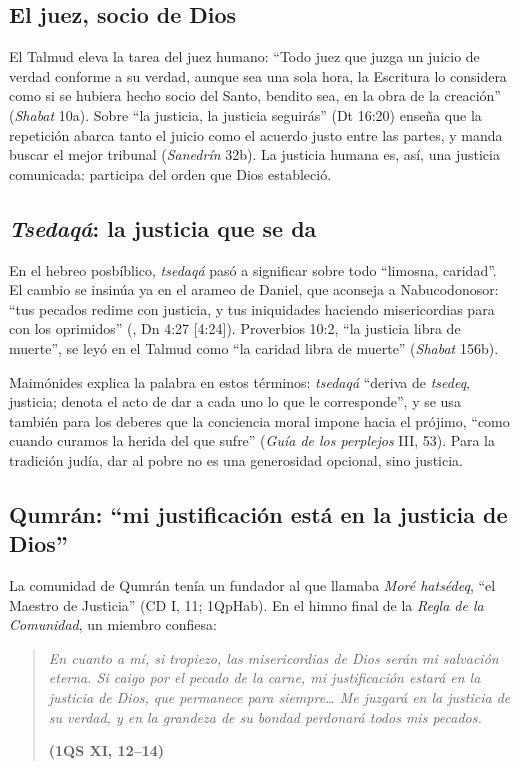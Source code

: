 \subsection{El juez, socio de Dios}
El Talmud eleva la tarea del juez humano: ``Todo juez que juzga un juicio de verdad conforme a su verdad, aunque sea una sola hora, la Escritura lo considera como si se hubiera hecho socio del Santo, bendito sea, en la obra de la creación'' (\emph{Shabat} 10a). Sobre ``la justicia, la justicia seguirás'' (Dt 16:20) enseña que la repetición abarca tanto el juicio como el acuerdo justo entre las partes, y manda buscar el mejor tribunal (\emph{Sanedrín} 32b). La justicia humana es, así, una justicia comunicada: participa del orden que Dios estableció.

\subsection{\emph{Tsedaqá}: la justicia que se da}
En el hebreo posbíblico, \emph{tsedaqá} pasó a significar sobre todo ``limosna, caridad''. El cambio se insinúa ya en el arameo de Daniel, que aconseja a Nabucodonosor: ``tus pecados redime con justicia, y tus iniquidades haciendo misericordias para con los oprimidos'' (, Dn 4:27 [4:24]). Proverbios 10:2, ``la justicia libra de muerte'', se leyó en el Talmud como ``la caridad libra de muerte'' (\emph{Shabat} 156b).

Maimónides explica la palabra en estos términos: \emph{tsedaqá} ``deriva de \emph{tsedeq}, justicia; denota el acto de dar a cada uno lo que le corresponde'', y se usa también para los deberes que la conciencia moral impone hacia el prójimo, ``como cuando curamos la herida del que sufre'' (\emph{Guía de los perplejos} III, 53). Para la tradición judía, dar al pobre no es una generosidad opcional, sino justicia.

\subsection{Qumrán: “mi justificación está en la justicia de Dios”}
La comunidad de Qumrán tenía un fundador al que llamaba  \emph{Moré hatsédeq}, ``el Maestro de Justicia'' (CD I, 11; 1QpHab). En el himno final de la \emph{Regla de la Comunidad}, un miembro confiesa:

\begin{quote}\itshape
En cuanto a mí, si tropiezo, las misericordias de Dios serán mi salvación eterna. Si caigo por el pecado de la carne, mi justificación estará en la justicia de Dios, que permanece para siempre\ldots{} Me juzgará en la justicia de su verdad, y en la grandeza de su bondad perdonará todos mis pecados.\par\hfill{\upshape\small\bfseries\textcolor{azulp}{(1QS XI, 12--14)}}
\end{quote}

